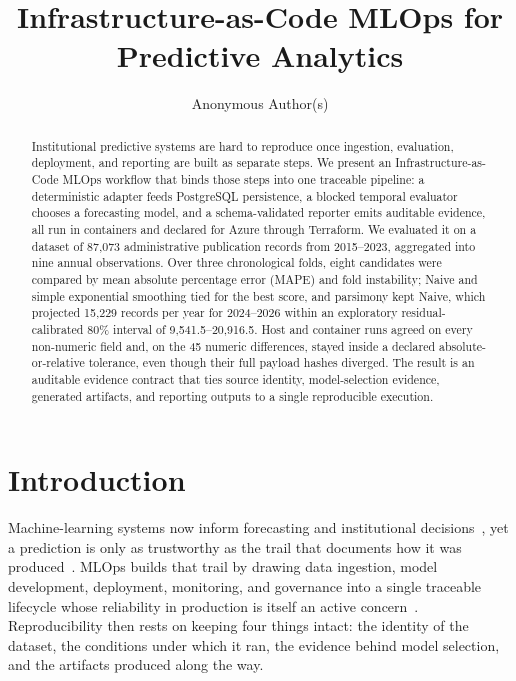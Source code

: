 \documentclass[runningheads]{llncs}
\begin{document}
    \title{Infrastructure-as-Code MLOps for Predictive Analytics}

    \author{Anonymous Author(s)}



    \maketitle
    \begin{abstract}
        Institutional predictive systems are hard to reproduce once ingestion, evaluation, deployment, and reporting are built as separate steps. We present an Infrastructure-as-Code MLOps workflow that binds those steps into one traceable pipeline: a deterministic adapter feeds PostgreSQL persistence, a blocked temporal evaluator chooses a forecasting model, and a schema-validated reporter emits auditable evidence, all run in containers and declared for Azure through Terraform. We evaluated it on a dataset of 87,073 administrative publication records from 2015--2023, aggregated into nine annual observations. Over three chronological folds, eight candidates were compared by mean absolute percentage error (MAPE) and fold instability; Naive and simple exponential smoothing tied for the best score, and parsimony kept Naive, which projected 15,229 records per year for 2024--2026 within an exploratory residual-calibrated 80\% interval of 9,541.5--20,916.5. Host and container runs agreed on every non-numeric field and, on the 45 numeric differences, stayed inside a declared absolute-or-relative tolerance, even though their full payload hashes diverged. The result is an auditable evidence contract that ties source identity, model-selection evidence, generated artifacts, and reporting outputs to a single reproducible execution.
    \end{abstract}

    \section{Introduction}

        Machine-learning systems now inform forecasting and institutional decisions~\cite{ref26}, yet a prediction is only as trustworthy as the trail that documents how it was produced~\cite{ref22}. MLOps builds that trail by drawing data ingestion, model development, deployment, monitoring, and governance into a single traceable lifecycle whose reliability in production is itself an active concern~\cite{ref1,ref2,ref3,ref23}. Reproducibility then rests on keeping four things intact: the identity of the dataset, the conditions under which it ran, the evidence behind model selection, and the artifacts produced along the way.
\end{document}
